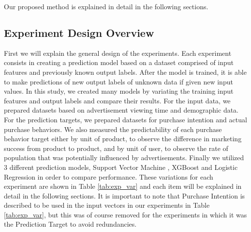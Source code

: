 \documentclass[review]{elsarticle}
\begin{document}
Our proposed method is explained in detail in the following sections.

\subsection{Experiment Design Overview}
\label{exp_design}

First we will explain the general design of the experiments. Each experiment consists in creating a prediction model based on a dataset comprised of input features and previously known output labels. After the model is trained, it is able to make predictions of new output labels of unknown data if given new input values. In this study, we created many models by variating the training input features and output labels and compare their results. For the input data, we prepared datasets based on advertisement viewing time and demographic data. For the prediction targets, we prepared datasets for purchase intention and actual purchase behaviors. We also measured the predictability of each purchase behavior target either by unit of product, to observe the difference in marketing success from product to product, and by unit of user, to observe the rate of population that was potentially influenced by advertisements. Finally we utilized 3 different prediction models, Support Vector Machine \cite{svm}, XGBoost \cite{xgboost} and Logistic Regression \cite{logit} in order to compare performance. These variations for each experiment are shown in Table \ref{tab:exp_var} and each item will be explained in detail in the following sections. It is important to note that Purchase Intention is described to be used in the input vectors in our experiments in Table \ref{tab:exp_var}, but this was of course removed for the experiments in which it was the Prediction Target to avoid redundancies.
\end{document}
